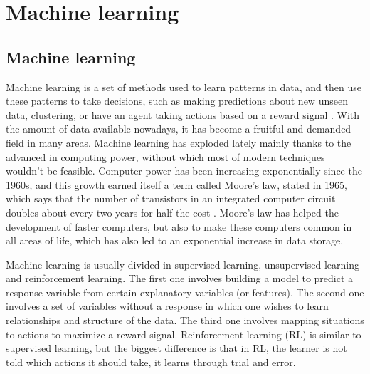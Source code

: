 
\chapter{Machine learning}
\label{ch:machine_learning}




\section{Machine learning}

Machine learning is a set of methods used to learn patterns in data, and then use these patterns to take decisions, such as making predictions about new unseen data,  clustering, or have an agent taking actions based on a reward signal \cite{murphy2012machine} \cite{sutton1998reinforcement}. With the amount of data available nowadays, it has become a fruitful and demanded field in many areas. Machine learning has exploded lately mainly thanks to the advanced in computing power, without which most of modern techniques wouldn't be feasible. Computer power has been increasing exponentially since the 1960s, and this growth earned itself a term called Moore's law, stated in 1965, which says that the number of transistors in an integrated computer circuit doubles about every two years for half the cost \cite{moore2006cramming} \cite{moore1975progress}. Moore's law has helped the development of faster computers, but also to make these computers common in all areas of life, which has also led to an exponential increase in data storage.

Machine learning is usually divided in supervised learning, unsupervised learning and reinforcement learning. The first one involves building a model to predict a response variable from certain explanatory variables (or features). The second one involves a set of variables without a response in which one wishes to learn relationships and structure of the data. The third one involves mapping situations to actions to maximize a reward signal. Reinforcement learning (RL) is similar to supervised learning, but the biggest difference is that in RL, the learner is not told which actions it should take, it learns through trial and error.

